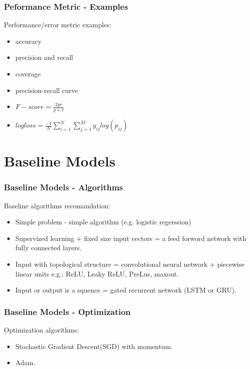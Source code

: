 \documentclass{beamer}
\begin{document}
\begin{frame}
    \frametitle{Peformance Metric - Examples}
    Performance/error metric examples:
    \begin{itemize}
       \item accuracy
       \item precision and recall
       \item coverage
       \item precision-recall curve
       \item $F-score = \frac{2pr}{p+r}$
       \item $logloss = \frac{-1}{N} $$\sum_{i=1}^{N}$$ $$\sum_{j=1}^{M}$$
           y_{ij}log(p_{ij})$
    \end{itemize}
\end{frame}

\section{Baseline Models}\label{sec:baseline-model}
\begin{frame}
    \frametitle{Baseline Models - Algorithms}
    Baseline algorithms recomandation:
    \begin{itemize}
        \item Simple problem - simple algorithm (e.g. logistic regerssion)
        \item Supervized learning + fixed size input vectors = a feed forword
            network with fully connected layers.
        \item Input with topological structure = convolutional neural network +
            piecewise linear units e.g.: ReLU, Leaky ReLU, PreLus, maxout.
        \item Input or output is a squence = gated recurrent network (LSTM or GRU).
    \end{itemize}
\end{frame}

\begin{frame}
    \frametitle{Baseline Models - Optimization}
    Optimization algorithms:
    \begin{itemize}
        \item Stochastic Gradient Descent(SGD) with momentum.
        \item Adam.
    \end{itemize}
\end{frame}
\end{document}

